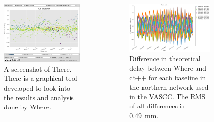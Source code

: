 \documentclass{beamer}
\begin{document}
\begin{frame}[t]
  \vspace*{1cm}
  \begin{columns}
    \begin{column}[t]{.24\textwidth}
      \begin{figure}
        \includegraphics[width=.8\textwidth]{figure/there}
        \caption{A screenshot of There. There is a graphical tool developed to
          look into the results and analysis done by Where.}
        \label{fig:there}
      \end{figure}
    \end{column}

    \begin{column}[t]{.24\textwidth}
      \begin{figure}
        \includegraphics[width=\textwidth]{figure/where_vs_c5++_NH}
        \caption{Difference in theoretical delay between Where and c5++ for each
          baseline in the northern network used in the VASCC. The RMS of all
          differences is 0.49~mm.}
        \label{fig:where_c5++_sh}
      \end{figure}
    \end{column}


\end{columns}
\end{frame}
\end{document}
